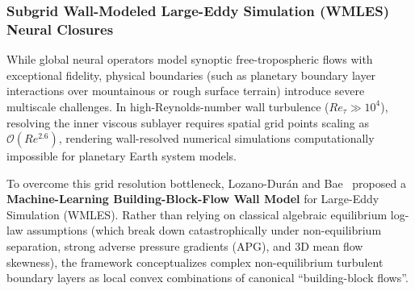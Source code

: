 \subsubsection{Subgrid Wall-Modeled Large-Eddy Simulation (WMLES) Neural Closures}
While global neural operators model synoptic free-tropospheric flows with exceptional fidelity, physical boundaries (such as planetary boundary layer interactions over mountainous or rough surface terrain) introduce severe multiscale challenges. In high-Reynolds-number wall turbulence ($Re_\tau \gg 10^4$), resolving the inner viscous sublayer requires spatial grid points scaling as $\mathcal{O}(Re^{2.6})$, rendering wall-resolved numerical simulations computationally impossible for planetary Earth system models.

To overcome this grid resolution bottleneck, Lozano-Dur\'an and Bae~\cite{lozano2023buildingblock} proposed a \textbf{Machine-Learning Building-Block-Flow Wall Model} for Large-Eddy Simulation (WMLES). Rather than relying on classical algebraic equilibrium log-law assumptions (which break down catastrophically under non-equilibrium separation, strong adverse pressure gradients (APG), and 3D mean flow skewness), the framework conceptualizes complex non-equilibrium turbulent boundary layers as local convex combinations of canonical ``building-block flows''.

